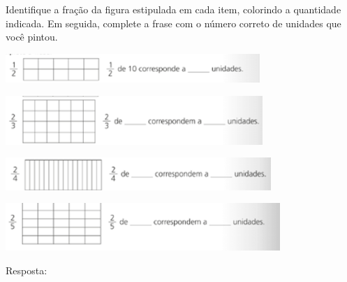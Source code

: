 \begin{mdframed}[linewidth=2pt,linecolor=salmao,roundcorner=2pt]
\begin{escolha}
{{Identifique a fração da figura estipulada em cada item, colorindo a
quantidade indicada. Em seguida, complete a frase com o número correto de
unidades que você pintou.


\begin{escolha}
\item
\end{escolha}

\includegraphics[width=3.79199in,height=0.43337in]{media/image114.png}

\begin{escolha}
\item
\end{escolha}

\includegraphics[width=3.83367in,height=0.72506in]{media/image115.png}

\begin{escolha}
\item
\end{escolha}

\includegraphics[width=3.95868in,height=0.48337in]{media/image116.png}

\begin{escolha}
\item
\end{escolha}

\includegraphics[width=4.09202in,height=0.70839in]{media/image117.png}

Resposta:

}}
\end{escolha}
\end{mdframed}
